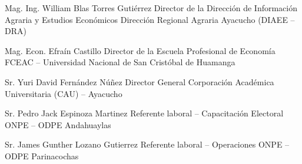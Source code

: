 

\begin{referees}
	
	{Mag. Ing. William Blas Torres Gutiérrez}
	{Director de la Dirección de Información Agraria y Estudios Económicos}
	{Dirección Regional Agraria Ayacucho (DIAEE -- DRA)}
	
	{Mag. Econ. Efraín Castillo}
	{Director de la Escuela Profesional de Economía}
	{FCEAC -- Universidad Nacional de San Cristóbal de Huamanga}
	
	{Sr. Yuri David Fernández Núñez}
	{Director General}
	{Corporación Académica Universitaria (CAU) -- Ayacucho}

	{Sr. Pedro Jack Espinoza Martinez}
	{Referente laboral -- Capacitación Electoral}
	{ONPE -- ODPE Andahuaylas}

	{Sr. James Gunther Lozano Gutierrez}
	{Referente laboral -- Operaciones}
	{ONPE -- ODPE Parinacochas}


\end{referees}
